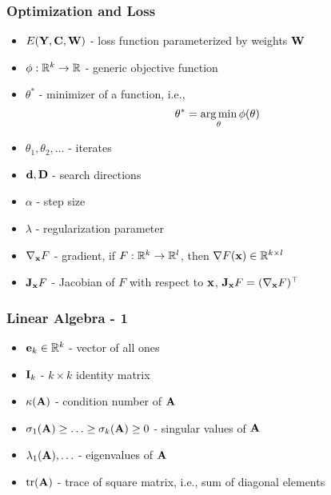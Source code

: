 \documentclass[12pt,fleqn]{beamer}
\begin{document}
\begin{frame}
	\frametitle{Optimization and Loss}
	
	\begin{itemize}
		\item $E({\bf Y},{\bf C},{\bf W})$ - loss function parameterized by weights ${\bf W}$
		\item $\phi : \mathbb{R}^{k} \to \mathbb{R}$ - generic objective function
		\item $\theta^*$ - minimizer of a function, i.e.,
		$$
			\theta^* = \operatorname*{arg\,min}_{\theta} \phi(\theta)
		$$
		\item $\theta_1,\theta_2, \ldots$ - iterates
		\item ${\bf d}, {\bf D}$ - search directions
		\item $\alpha$ - step size
		\item $\lambda$ - regularization parameter
		\item $\nabla_{\bf x} F$ - gradient, if $ F : \mathbb{R}^k \to \mathbb{R}^l $, then $\nabla F({\bf x}) \in \mathbb{R}^{k\times l}$
		\item ${\bf J}_{\bf x} F$ - Jacobian of $F$ with respect to ${\bf x}$, ${\bf J}_{{\bf x}} F = (\nabla_{\bf x} F)^\top$
	\end{itemize}
\end{frame}

\begin{frame}
	\frametitle{Linear Algebra - 1}
	\begin{itemize}
		\item ${\bf e}_k \in\mathbb{R}^k$ - vector of all ones
		\item ${\bf I}_k$ - $k\times k$ identity matrix
		\item $\kappa({\bf A})$ - condition number of ${\bf A}$
		\item $\sigma_1({\bf A})\geq\ldots\geq\sigma_k({\bf A})\geq 0$ - singular values of ${\bf A}$
		\item $\lambda_1({\bf A}),\ldots$ - eigenvalues of ${\bf A}$
		\item ${\rm tr}({\bf A})$ - trace of square matrix, i.e., sum of diagonal elements
	\end{itemize}
\end{frame}
\end{document}
